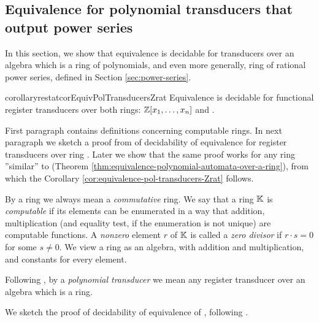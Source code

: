 \subsection{Equivalence for polynomial transducers that output power series}\label{sec:pol-transducers-any-ring}


In this section, we show that equivalence is decidable for transducers over an algebra which is a ring of polynomials, and even more generally, ring of rational power series, defined in Section \ref{sec:power-series}.
\begin{restatable}{corollaryrestat}{corEquivPolTransducersZrat}\label{cor:equivalence-pol-transducers-Zrat}
		Equivalence is decidable for functional register transducers over both rings: $\mathbb{Z}[x_{1}, \ldots, x_{n}]$ and \Zrat.
\end{restatable}
First paragraph contains definitions concerning computable rings. In next paragraph we sketch a proof from \cite[Theorem 6.6]{seidlManethKemper2018} of decidability of equivalence for register transducers over ring \Z. Later we show that the same proof works for any ring ''similar'' to \Z (Theorem \ref{thm:equivalence-polynomial-automata-over-a-ring}), from which the Corollary \ref{cor:equivalence-pol-transducers-Zrat} follows.

By a ring we always mean a \emph{commutative} ring.
We say that a ring ${\mathbb K}$ is \emph{computable} if its elements can be enumerated in a way that addition, multiplication (and equality test, if the enumeration is not unique) are computable functions. A \emph{nonzero} element $r$ of ${\mathbb K}$ is called a \emph{zero divisor} if $r \cdot s = 0$ for some $s \neq 0$. We view a ring as an algebra, with addition and multiplication, and constants for every element.

Following \cite{seidlManethKemper2018}, by a \emph{polynomial transducer} we mean any register transducer over an algebra which is a ring.

We sketch the proof of decidability of equivalence of \polTsover{\Z}, following \cite{seidlManethKemper2018}.

